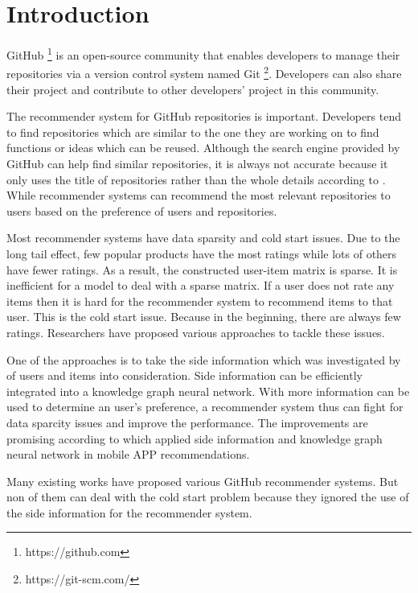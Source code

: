 \documentclass[11pt,twoside]{report}
\begin{document}
{
    \hypersetup{linkcolor=black}
    \tableofcontents
}


\chapter{Introduction}
GitHub \footnote{https://github.com} is an open-source community that enables developers to manage their repositories via a version control system named Git \footnote{https://git-scm.com/}. Developers can also share their project and contribute to other developers’ project in this community.

The recommender system for GitHub repositories is important. Developers tend to find repositories which are similar to the one they are working on to find functions or ideas which can be reused. Although the search engine provided by GitHub can help find similar repositories, it is always not accurate because it only uses the title of repositories rather than the whole details according to \cite{xu_repersp_2017}. While recommender systems can recommend the most relevant repositories to users based on the preference of users and repositories.

Most recommender systems have data sparsity and cold start issues. Due to the long tail effect, few popular products have the most ratings while lots of others have fewer ratings. As a result, the constructed user-item matrix is sparse. It is inefficient for a model to deal with a sparse matrix. If a user does not rate any items then it is hard for the recommender system to recommend items to that user. This is the cold start issue. Because in the beginning, there are always few ratings. Researchers have proposed various approaches to tackle these issues.

One of the approaches is to take the side information which was investigated by \cite{jonschkowski_patterns_2016} of users and items into consideration. Side information can be efficiently integrated into a knowledge graph neural network. With more information can be used to determine an user's preference, a recommender system thus can fight for data sparcity issues and improve the performance. The improvements are promising according to \cite{zhang_knowledge_2020} which applied side information and knowledge graph neural network in mobile APP recommendations.

Many existing works have proposed various GitHub recommender systems. But non of them can deal with the cold start problem because they ignored the use of the side information for the recommender system.
\end{document}
